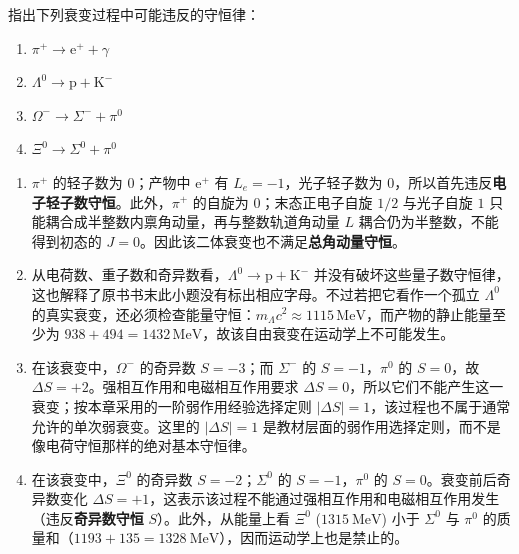 \begin{exercise}\label{ex:30.3}
指出下列衰变过程中可能违反的守恒律：
\begin{enumerate}
  \item[(a)] $\pi^+ \rightarrow \mathrm{e}^+ + \gamma$
  \item[(b)] $\Lambda^0 \rightarrow \mathrm{p} + \mathrm{K}^-$
  \item[(c)] $\Omega^- \rightarrow \Sigma^- + \pi^0$
  \item[(d)] $\Xi^0 \rightarrow \Sigma^0 + \pi^0$
\end{enumerate}
\end{exercise}
\begin{solution}
\begin{enumerate}
    \item[(a)] $\pi^+$ 的轻子数为 $0$；产物中 $\mathrm{e}^+$ 有 $L_e=-1$，光子轻子数为 $0$，所以首先违反\textbf{电子轻子数守恒}。此外，$\pi^+$ 的自旋为 $0$；末态正电子自旋 $1/2$ 与光子自旋 $1$ 只能耦合成半整数内禀角动量，再与整数轨道角动量 $L$ 耦合仍为半整数，不能得到初态的 $J=0$。因此该二体衰变也不满足\textbf{总角动量守恒}。
    \item[(b)] 从电荷数、重子数和奇异数看，$\Lambda^0 \rightarrow \mathrm{p}+\mathrm{K}^-$ 并没有破坏这些量子数守恒律，这也解释了原书书末此小题没有标出相应字母。不过若把它看作一个孤立 $\Lambda^0$ 的真实衰变，还必须检查能量守恒：$m_{\Lambda}c^2\approx1115\,\mathrm{MeV}$，而产物的静止能量至少为 $938+494=1432\,\mathrm{MeV}$，故该自由衰变在运动学上不可能发生。
    \item[(c)] 在该衰变中，$\Omega^-$ 的奇异数 $S=-3$；而 $\Sigma^-$ 的 $S=-1$，$\pi^0$ 的 $S=0$，故 $\Delta S=+2$。强相互作用和电磁相互作用要求 $\Delta S=0$，所以它们不能产生这一衰变；按本章采用的一阶弱作用经验选择定则 $|\Delta S|=1$，该过程也不属于通常允许的单次弱衰变。这里的 $|\Delta S|=1$ 是教材层面的弱作用选择定则，而不是像电荷守恒那样的绝对基本守恒律。
    \item[(d)] 在该衰变中，$\Xi^0$ 的奇异数 $S = -2$；$\Sigma^0$ 的 $S = -1$，$\pi^0$ 的 $S = 0$。衰变前后奇异数变化 $\Delta S = +1$，这表示该过程不能通过强相互作用和电磁相互作用发生（违反\textbf{奇异数守恒} $S$）。此外，从能量上看 $\Xi^0$ ($1315 \ \mathrm{MeV}$) 小于 $\Sigma^0$ 与 $\pi^0$ 的质量和（$1193 + 135 = 1328 \ \mathrm{MeV}$），因而运动学上也是禁止的。
\end{enumerate}
\end{solution}

